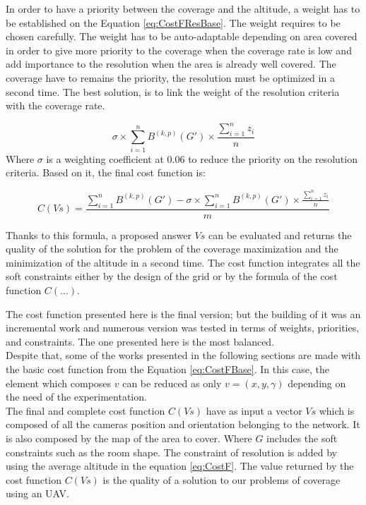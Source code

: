 In order to have a priority  between the coverage and the altitude, a weight has to be established on the Equation \ref{eq:CostFResBase}. The weight requires to be chosen carefully.
The weight has to be auto-adaptable depending on area covered in order to give more priority to the coverage when the coverage rate is low and add importance to the resolution when the area is already well covered. The coverage have to remains the priority, the resolution must be optimized in a second time.
The best solution, is to link the weight of the resolution criteria with the coverage rate.

\begin{equation}\label{eq:CostFResPondere}
  \sigma \times \sum_{i=1}^n {B^{(k,p)}(G')} \times \frac{\sum_{i=1}^n z_i}{n}     
\end{equation}
Where $\sigma$ is a weighting coefficient at 0.06 to reduce the priority on the resolution criteria. 
Based on it, the final cost function is: 

\begin{equation}\label{eq:CostF}
C(Vs) =  \frac{\sum_{i=1}^n{B^{(k,p)}(G')}  - \sigma  \times \sum_{i=1}^n {B^{(k,p)}(G')} \times \frac{\sum_{i=1}^n z_i}{n}  }{m}   
\end{equation}

Thanks to this formula, a proposed answer $Vs$ can be evaluated and returns the quality of the solution for the problem of the coverage maximization and the minimization of the altitude in a second time. The cost function integrates all the soft constraints either by the design of the grid or by the formula of the cost function $C(...)$.

The cost function presented here is the final version; but the building of it was an incremental work and numerous version was tested in terms of weights, priorities, and constraints. The one presented here is the most balanced.\\ 
Despite that, some of the works  presented in the following sections are made with the basic cost function from the Equation \ref{eq:CostFBase}. In this case, the element which composes $v$ can be reduced as only $v=(x,y,\gamma)$ depending on the need of the experimentation.\\

The final and complete cost function $C(Vs)$ have as input a vector $Vs$ which is composed of all the cameras position and orientation belonging to the network. It is also composed by the map of the area to cover. Where $G$ includes the soft constraints such as the room shape. The constraint of resolution is added by using the average altitude in the equation \ref{eq:CostF}.
The value returned by the cost function $C(Vs)$ is the quality of a solution to our problems of coverage using an UAV.






